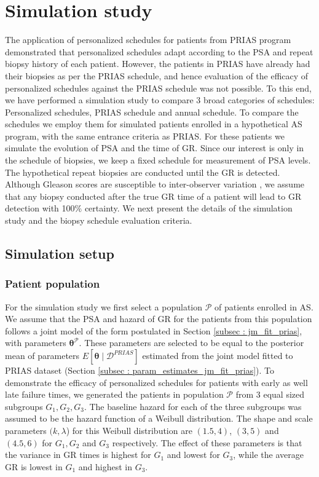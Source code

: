 
\section{Simulation study}
\label{sec: simulation_study}
The application of personalized schedules for patients from PRIAS program demonstrated that personalized schedules adapt according to the PSA and repeat biopsy history of each patient. However, the patients in PRIAS have already had their biopsies as per the PRIAS schedule, and hence evaluation of the efficacy of personalized schedules against the PRIAS schedule was not possible. To this end, we have performed a simulation study to compare 3 broad categories of schedules: Personalized schedules, PRIAS schedule and annual schedule. To compare the schedules we employ them for simulated patients enrolled in a hypothetical AS program, with the same entrance criteria as PRIAS. For these patients we simulate the evolution of PSA and the time of GR. Since our interest is only in the schedule of biopsies, we keep a fixed schedule for measurement of PSA levels. The hypothetical repeat biopsies are conducted until the GR is detected. Although Gleason scores are susceptible to inter-observer variation \citep{Gleason_interobs_var}, we assume that any biopsy conducted after the true GR time of a patient will lead to GR detection with 100\% certainty. We next present the details of the simulation study and the biopsy schedule evaluation criteria.

\subsection{Simulation setup}
\label{subsec : simulation_setup}
\subsubsection{Patient population}
For the simulation study we first select a population $\mathcal{P}$ of patients enrolled in AS. We assume that the PSA and hazard of GR for the patients from this population follows a joint model of the form postulated in Section \ref{subsec : jm_fit_prias}, with parameters $\boldsymbol{\theta}^{\mathcal{P}}$. These parameters are selected to be equal to the posterior mean of parameters $E[\boldsymbol{\theta} \mid \mathcal{D}^{PRIAS}]$ estimated from the joint model fitted to PRIAS dataset (Section \ref{subsec : param_estimates_jm_fit_prias}). To demonstrate the efficacy of personalized schedules for patients with early as well late failure times, we generated the patients in population $\mathcal{P}$ from 3 equal sized subgroups $G_1, G_2, G_3$. The baseline hazard for each of the three subgroups was assumed to be the hazard function of a Weibull distribution. The shape and scale parameters $(k, \lambda$) for this Weibull distribution are $(1.5, 4)$, $(3, 5)$ and $(4.5, 6)$ for $G_1, G_2$ and $G_3$ respectively. The effect of these parameters is that the variance in GR times is highest for $G_1$ and lowest for $G_3$, while the average GR is lowest in $G_1$ and highest in $G_3$.

